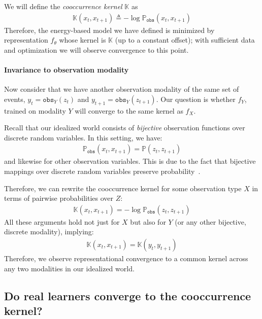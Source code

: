 We will define the \textit{cooccurrence kernel} $\mathbb{K}$ as
\begin{align}
    \mathbb{K}(x_t,x_{t+1}) \triangleq -\log \mathbb{P}_{\texttt{obs}}(x_t,x_{t+1})
\end{align}
Therefore, the energy-based model we have defined is minimized by representation $f_{\theta}$ whose kernel is $\mathbb{K}$ (up to a constant offset); with sufficient data and optimization we will observe convergence to this point.

\paragraph{Invariance to observation modality}
Now consider that we have another observation modality of the same set of events, $y_t = \texttt{obs}_Y(z_t)$ and $y_{t+1} = \texttt{obs}_Y(z_{t+1})$. Our question is whether $f_Y$, trained on modality $Y$ will converge to the same kernel as $f_X$.

Recall that our idealized world consists of \textit{bijective} observation functions over discrete random variables. In this setting, we have:
\begin{align}
    \mathbb{P}_{\texttt{obs}}(x_t, x_{t+1}) = \mathbb{P}(z_t, z_{t+1})
\end{align}
and likewise for other observation variables. This is due to the fact that bijective mappings over discrete random variables preserve probability~\cite{XX}.

Therefore, we can rewrite the cooccurrence kernel for some observation type $X$ in terms of pairwise probabilities over $Z$:
\begin{align}
    \mathbb{K}(x_t, x_{t+1}) = -\log \mathbb{P}_{\texttt{obs}}(z_t, z_{t+1})
\end{align}
All these arguments hold not just for $X$ but also for $Y$ (or any other bijective, discrete modality), implying:
\begin{align}
    \mathbb{K}(x_t, x_{t+1}) = \mathbb{K}(y_t, y_{t+1})
\end{align}
Therefore, we observe representational convergence to a common kernel across any two modalities in our idealized world.

\subsection{Do real learners converge to the cooccurrence kernel?}

